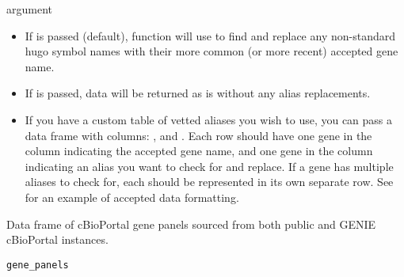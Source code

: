 \documentclass[a4paper]{book}
\begin{document}
\begin{Section}{ argument}

\begin{itemize}

\item{} If  is passed (default), function will use  to find and replace any non-standard hugo symbol names with their
more common (or more recent) accepted gene name.
\item{} If  is passed, data will be returned as is without any alias replacements.
\item{} If you have a custom table of vetted aliases you wish to use, you can pass a data frame with columns: , and .
Each row should have one gene in the  column indicating the accepted gene name, and one gene in the  column indicating an alias
you want to check for and replace. If a gene has multiple aliases to check for, each should be represented in its own separate row.
See  for an example of accepted data formatting.

\end{itemize}

\end{Section}
%
\begin{Examples}
\end{Examples}
%
\begin{Description}\relax
Data frame of cBioPortal gene panels sourced from both public and GENIE cBioPortal instances.
\end{Description}
%
\begin{Usage}
\begin{verbatim}
gene_panels
\end{verbatim}
\end{Usage}
%
\end{document}

